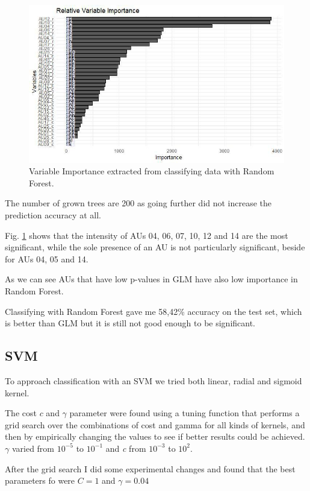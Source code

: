\begin{figure}[H]
	\centering
	\includegraphics[width=1\textwidth]{images/varimp}
	\caption{Variable Importance extracted from classifying data with Random Forest.}
	\label{fig:varimp}
\end{figure}

The number of grown trees are 200 as going further did not increase the prediction accuracy at all.

Fig. \ref{fig:varimp} shows that the intensity of AUs 04, 06, 07, 10, 12 and 14 are the most significant, while the sole presence of an AU is not particularly significant, beside for AUs 04, 05 and 14.

As we can see AUs that have low p-values in GLM have also low importance in Random Forest.

Classifying with Random Forest gave me 58,42\% accuracy on the test set, which is better than GLM but it is still not good enough to be significant.

\clearpage

\subsection{SVM} \label{SVM}
To approach classification with an SVM we tried both linear, radial and sigmoid kernel.

The cost $c$ and $\gamma$ parameter were found using a tuning function that performs a grid search over the combinations of cost and gamma for all kinds of kernels, and then by empirically changing the values to see if better results could be achieved. $\gamma$ varied from $10^{-5}$ to $10^{-1}$ and \textit{c} from $10^{-3}$ to $10^2$. 

After the grid search I did some experimental changes and found that the best parameters fo were $C = 1$ and $\gamma = 0.04$


